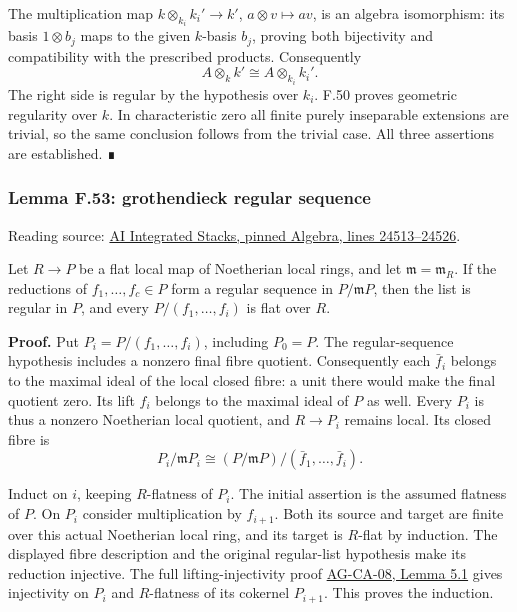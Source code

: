 \documentclass[11pt,a4paper,openany]{report}
\begin{document}
The multiplication map \(k\otimes_{k_i}k_i'\to k'\), \(a\otimes v\mapsto av\), is an algebra isomorphism: its basis \(1\otimes b_j\) maps to the given \(k\)-basis \(b_j\), proving both bijectivity and compatibility with the prescribed products. Consequently \[A\otimes_kk'\cong A\otimes_{k_i}k_i'.\] The right side is regular by the hypothesis over \(k_i\). F.50 proves geometric regularity over \(k\). In characteristic zero all finite purely inseparable extensions are trivial, so the same conclusion follows from the trivial case. All three assertions are established. ∎

\label{AG-RG-S05-algebra-lemma-grothendieck-regular-sequence}

\subsubsection{Lemma F.53: grothendieck regular sequence}\label{AG-RG-S05-lemma-f.53-grothendieck-regular-sequence}

Reading source: \href{https://github.com/KokunoYumeto/unofficial-stacks-project-ai-drafts/blob/565b10e987aba5969b21145a0833f42d69f96790/algebra.tex\#L24513-L24526}{AI Integrated Stacks, pinned Algebra, lines 24513--24526}.

Let \(R\to P\) be a flat local map of Noetherian local rings, and let \(\mathfrak m=\mathfrak m_R\). If the reductions of \(f_1,\ldots,f_c\in P\) form a regular sequence in \(P/\mathfrak mP\), then the list is regular in \(P\), and every \(P/(f_1,\ldots,f_i)\) is flat over \(R\).

\textbf{Proof.} Put \(P_i=P/(f_1,\ldots,f_i)\), including \(P_0=P\). The regular-sequence hypothesis includes a nonzero final fibre quotient. Consequently each \(\bar f_i\) belongs to the maximal ideal of the local closed fibre: a unit there would make the final quotient zero. Its lift \(f_i\) belongs to the maximal ideal of \(P\) as well. Every \(P_i\) is thus a nonzero Noetherian local quotient, and \(R\to P_i\) remains local. Its closed fibre is \[P_i/\mathfrak mP_i
\cong(P/\mathfrak mP)/(\bar f_1,\ldots,\bar f_i).\]

Induct on \(i\), keeping \(R\)-flatness of \(P_i\). The initial assertion is the assumed flatness of \(P\). On \(P_i\) consider multiplication by \(f_{i+1}\). Both its source and target are finite over this actual Noetherian local ring, and its target is \(R\)-flat by induction. The displayed fibre description and the original regular-list hypothesis make its reduction injective. The full lifting-injectivity proof \href{https://github.com/KokunoYumeto/open-math-courses/blob/d02d0a3669f42579db037cd44de1d113fdd770a1/docs/courses/AG-CA/src/faithful-flatness-and-the-local-criterion-for-flatness.md}{AG-CA-08, Lemma 5.1} gives injectivity on \(P_i\) and \(R\)-flatness of its cokernel \(P_{i+1}\). This proves the induction.
\end{document}
